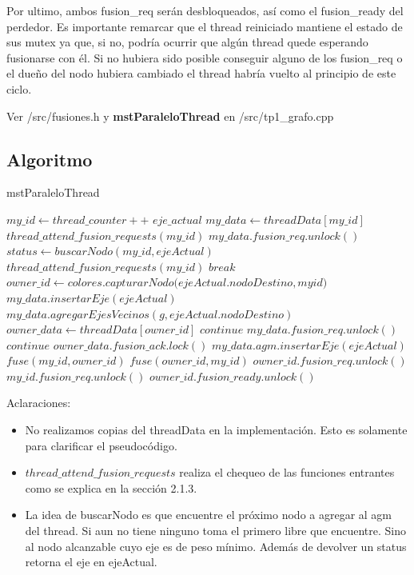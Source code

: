 Por ultimo, ambos fusion\_req serán desbloqueados, así como el fusion\_ready del perdedor. Es importante remarcar que el thread reiniciado mantiene el estado de sus mutex ya que, si no, podría ocurrir que algún thread quede esperando fusionarse con él. Si no hubiera sido posible conseguir alguno de los fusion\_req o el dueño del nodo hubiera cambiado el thread habría vuelto al principio de este ciclo.

Ver \textmd{/src/fusiones.h} y \textbf{mstParaleloThread} en \textmd{/src/tp1_grafo.cpp}

\subsection{Algoritmo}

\begin{algorithm}
\caption{mstParaleloThread}
\begin{algorithmic}

\STATE $my\_id \gets thread\_counter++ $
\STATE $eje\_actual$
\STATE $my\_data \gets threadData[my\_id]$
\STATE $thread\_attend\_fusion\_requests(my\_id)$
\STATE $my\_data.fusion\_req.unlock()$
\STATE $status \gets buscarNodo(my\_id,ejeActual)$
\STATE $thread\_attend\_fusion\_requests(my\_id)$
\ENDIF
{}
\STATE $break$
\ENDIF
\STATE $owner\_id \gets colores.capturarNodo(ejeActual.nodoDestino,my$\textunderscore$id)$
\STATE $my\_data.insertarEje(ejeActual)$
\STATE $my\_data.agregarEjesVecinos(g,ejeActual.nodoDestino)$
\ELSE 
\STATE $owner\_data \gets threadData[owner\_id]$
\STATE $continue$
\ENDIF
{}
\STATE $my\_data.fusion\_req.unlock()$
\STATE $continue$
\ENDIF
\STATE $owner\_data.fusion\_ack.lock()$
\STATE $my\_data.agm.insertarEje(ejeActual)$
\STATE $fuse(my\_id,owner\_id)$
\ELSE
\STATE $fuse(owner\_id,my\_id)$
\ENDIF
\ENDIF
\ENDIF
\STATE $owner\_id.fusion\_req.unlock()$
\STATE $my\_id.fusion\_req.unlock()$
\STATE $owner\_id.fusion\_ready.unlock()$
\ENDWHILE

\end{algorithmic}
\end{algorithm}
\newpage

Aclaraciones:
\begin{itemize}
    \item No realizamos copias del threadData en la implementación. Esto es solamente para clarificar el pseudocódigo.
    \item $thread\_attend\_fusion\_requests$ realiza el chequeo de las funciones entrantes como se explica en la sección 2.1.3.
    \item La idea de buscarNodo es que encuentre el próximo nodo a agregar al agm del thread. Si aun no tiene ninguno toma el primero libre que encuentre. Sino al nodo alcanzable cuyo eje es de peso mínimo. Además de devolver un status retorna el eje en ejeActual.
\end{itemize}
